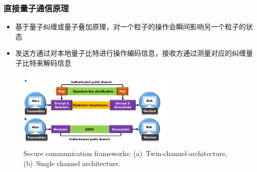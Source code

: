 \begin{frame}
    \frametitle{直接量子通信原理}
    \begin{itemize}
        \item 基于量子纠缠或量子叠加原理，对一个粒子的操作会瞬间影响另一个粒子的状态\\
		{\fontsize{7.5pt}{5.2pt}\selectfont{利用纠缠态的量子比特，实现信息的直接传输}}
        \item 发送方通过对本地量子比特进行操作编码信息，接收方通过测量对应的纠缠量子比特来解码信息
    \end{itemize}
    \begin{figure}
        \centering
                \includegraphics[height=1.5in, width=3.0in, viewport=0 0 753 342,clip]{Figures/Secure-communication-frameworks_Twin-channel-architecture_Single-channel-architecture.png}
		\caption{\tiny{\textrm{Secure communication frameworks: (a)~Twin-channel-architecture, (b)~Single channel architecture.}}}%
		\label{Fig:Secure-communication-frameworks_Twin-channel-architecture_Single-channel-architecture}
    \end{figure}
\end{frame}

